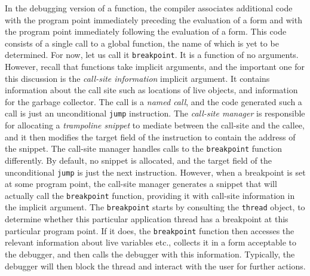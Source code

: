 In the debugging version of a function, the compiler associates
additional code with the program point immediately preceding the
evaluation of a form and with the program point immediately following
the evaluation of a form.  This code consists of a single call to a
global function, the name of which is yet to be determined.  For now,
let us call it \texttt{breakpoint}.  It is a function of no arguments.
However, recall that functions take implicit arguments, and the
important one for this discussion is the \emph{call-site information}
implicit argument.  It contains information about the call site such
as locations of live objects, and information for the garbage
collector.  The call is a \emph{named call}, and the code generated
such a call is just an unconditional \texttt{jump} instruction.  The
\emph{call-site manager} is responsible for allocating a
\emph{trampoline snippet} to mediate between the call-site and the
callee, and it then modifies the target field of the instruction to
contain the address of the snippet.  The call-site manager handles
calls to the \texttt{breakpoint} function differently.  By default, no
snippet is allocated, and the target field of the unconditional
\texttt{jump} is just the next instruction.  However, when a
breakpoint is set at some program point, the call-site manager
generates a snippet that will actually call the \texttt{breakpoint}
function, providing it with call-site information in the implicit
argument.  The \texttt{breakpoint} starts by consulting the
\texttt{thread} object, to determine whether this particular
application thread has a breakpoint at this particular program point.
If it does, the \texttt{breakpoint} function then accesses the
relevant information about live variables etc., collects it in a form
acceptable to the debugger, and then calls the debugger with this
information.  Typically, the debugger will then block the thread and
interact with the user for further actions.
